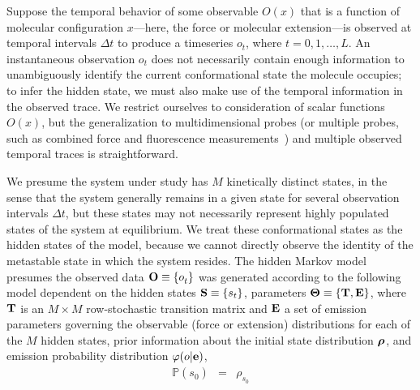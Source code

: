 \documentclass[aps,pre,twocolumn,superscriptaddress,nofootinbib,longbibliography]{revtex4-1}
\newcommand{\bfv}[1]{{\mbox{\boldmath{$#1$}}}}
\newcommand{\bfm}[1]{{\bf #1}}
\begin{document}
{Suppose the temporal behavior of some observable $O(x)$ that is a function of molecular configuration $x$---here, the force or molecular extension---is observed at temporal intervals $\Delta t$ to produce a timeseries $o_t$, where $t = 0, 1, \ldots, L$.
An instantaneous observation $o_t$ does not necessarily contain enough information to unambiguously identify the current conformational state the molecule occupies; to infer the hidden state, we must also make use of the temporal information in the observed trace.
We restrict ourselves to consideration of scalar functions $O(x)$, but the generalization to multidimensional probes (or multiple probes, such as combined force and fluorescence measurements~\cite{chemla:nature-methods:2011:fluorescence-force}) and multiple observed temporal traces is straightforward.

We presume the system under study has $M$ kinetically distinct states, in the sense that the system generally remains in a given state for several observation intervals $\Delta t$, but these states may not necessarily represent highly populated states of the system at equilibrium.
We treat these conformational states as the hidden states of the model, because we cannot directly observe the identity of the metastable state in which the system resides.
The hidden Markov model presumes the observed data $\bfm{O} \equiv \{o^{}_t\}$ was generated according to the following model dependent on {\color{red} the hidden states $\bfm{S} \equiv \{s_t\}$,} parameters $\bfm{\Theta} \equiv \{\bfm{T}, \bfm{E}\}$, where $\bfm{T}$ is an $M \times M$ row-stochastic transition matrix and $\bfm{E}$ a set of emission parameters governing the observable (force or extension) distributions for each of the $M$ hidden states, prior information about the initial state distribution $\bfv{\rho}^{}$, {\color{red} and emission probability distribution $\varphi(o | \bfm{e})$},
\begin{eqnarray}
\mathbb{P}(s^{}_0) &=& \rho^{}_{s^{}_0} \nonumber \\

\end{eqnarray}}
\end{document}
